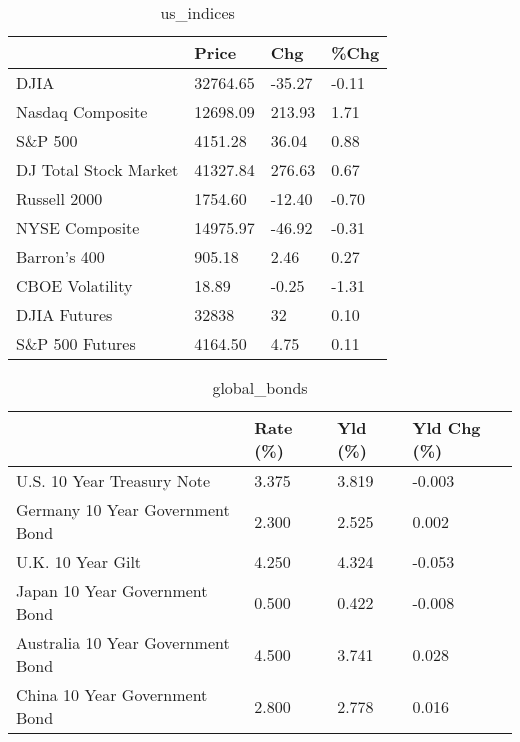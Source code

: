 \documentclass{article}%
\begin{document}
%


\begin{table}[htbp]%
\caption{us\_indices}%
\centering%
\begin{adjustbox}{width=1\textwidth}%
\begin{tabular}{llll}
\toprule
                      &    Price &    Chg &  \%Chg \\
\midrule
                 DJIA & 32764.65 & -35.27 & -0.11 \\
     Nasdaq Composite & 12698.09 & 213.93 &  1.71 \\
              S\&P 500 &  4151.28 &  36.04 &  0.88 \\
DJ Total Stock Market & 41327.84 & 276.63 &  0.67 \\
         Russell 2000 &  1754.60 & -12.40 & -0.70 \\
       NYSE Composite & 14975.97 & -46.92 & -0.31 \\
         Barron's 400 &   905.18 &   2.46 &  0.27 \\
      CBOE Volatility &    18.89 &  -0.25 & -1.31 \\
         DJIA Futures &    32838 &     32 &  0.10 \\
      S\&P 500 Futures &  4164.50 &   4.75 &  0.11 \\
\bottomrule
\end{tabular}
%
\end{adjustbox}%
\end{table}

%


\begin{table}[htbp]%
\caption{global\_bonds}%
\centering%
\begin{adjustbox}{width=1\textwidth}%
\begin{tabular}{llll}
\toprule
                                  & Rate (\%) & Yld (\%) & Yld Chg (\%) \\
\midrule
       U.S. 10 Year Treasury Note &    3.375 &   3.819 &      -0.003 \\
  Germany 10 Year Government Bond &    2.300 &   2.525 &       0.002 \\
                U.K. 10 Year Gilt &    4.250 &   4.324 &      -0.053 \\
    Japan 10 Year Government Bond &    0.500 &   0.422 &      -0.008 \\
Australia 10 Year Government Bond &    4.500 &   3.741 &       0.028 \\
    China 10 Year Government Bond &    2.800 &   2.778 &       0.016 \\
\bottomrule
\end{tabular}
%
\end{adjustbox}%
\end{table}
\end{document}
